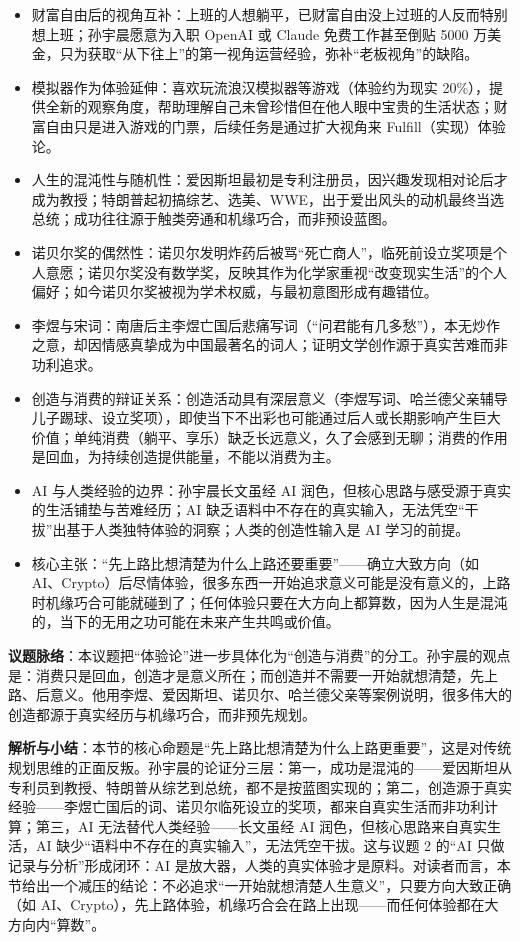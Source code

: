 \begin{itemize}
\tightlist
\item
  财富自由后的视角互补：上班的人想躺平，已财富自由没上过班的人反而特别想上班；孙宇晨愿意为入职
  OpenAI 或 Claude 免费工作甚至倒贴 5000
  万美金，只为获取``从下往上''的第一视角运营经验，弥补``老板视角''的缺陷。
\item
  模拟器作为体验延伸：喜欢玩流浪汉模拟器等游戏（体验约为现实
  20\%），提供全新的观察角度，帮助理解自己未曾珍惜但在他人眼中宝贵的生活状态；财富自由只是进入游戏的门票，后续任务是通过扩大视角来
  Fulfill（实现）体验论。
\item
  人生的混沌性与随机性：爱因斯坦最初是专利注册员，因兴趣发现相对论后才成为教授；特朗普起初搞综艺、选美、WWE，出于爱出风头的动机最终当选总统；成功往往源于触类旁通和机缘巧合，而非预设蓝图。
\item
  诺贝尔奖的偶然性：诺贝尔发明炸药后被骂``死亡商人''，临死前设立奖项是个人意愿；诺贝尔奖没有数学奖，反映其作为化学家重视``改变现实生活''的个人偏好；如今诺贝尔奖被视为学术权威，与最初意图形成有趣错位。
\item
  李煜与宋词：南唐后主李煜亡国后悲痛写词（``问君能有几多愁''），本无炒作之意，却因情感真挚成为中国最著名的词人；证明文学创作源于真实苦难而非功利追求。
\item
  创造与消费的辩证关系：创造活动具有深层意义（李煜写词、哈兰德父亲辅导儿子踢球、设立奖项），即使当下不出彩也可能通过后人或长期影响产生巨大价值；单纯消费（躺平、享乐）缺乏长远意义，久了会感到无聊；消费的作用是回血，为持续创造提供能量，不能以消费为主。
\item
  AI 与人类经验的边界：孙宇晨长文虽经 AI
  润色，但核心思路与感受源于真实的生活铺垫与苦难经历；AI
  缺乏语料中不存在的真实输入，无法凭空``干拔''出基于人类独特体验的洞察；人类的创造性输入是
  AI 学习的前提。
\item
  核心主张：``先上路比想清楚为什么上路还要重要''------确立大致方向（如
  AI、Crypto）后尽情体验，很多东西一开始追求意义可能是没有意义的，上路时机缘巧合可能就碰到了；任何体验只要在大方向上都算数，因为人生是混沌的，当下的无用之功可能在未来产生共鸣或价值。
\end{itemize}

\textbf{议题脉络}：本议题把``体验论''进一步具体化为``创造与消费''的分工。孙宇晨的观点是：消费只是回血，创造才是意义所在；而创造并不需要一开始就想清楚，先上路、后意义。他用李煜、爱因斯坦、诺贝尔、哈兰德父亲等案例说明，很多伟大的创造都源于真实经历与机缘巧合，而非预先规划。

\textbf{解析与小结}：本节的核心命题是``先上路比想清楚为什么上路更重要''，这是对传统规划思维的正面反叛。孙宇晨的论证分三层：第一，成功是混沌的------爱因斯坦从专利员到教授、特朗普从综艺到总统，都不是按蓝图实现的；第二，创造源于真实经验------李煜亡国后的词、诺贝尔临死设立的奖项，都来自真实生活而非功利计算；第三，AI
无法替代人类经验------长文虽经 AI 润色，但核心思路来自真实生活，AI
缺少``语料中不存在的真实输入''，无法凭空干拔。这与议题 2 的``AI
只做记录与分析''形成闭环：AI
是放大器，人类的真实体验才是原料。对读者而言，本节给出一个减压的结论：不必追求``一开始就想清楚人生意义''，只要方向大致正确（如
AI、Crypto），先上路体验，机缘巧合会在路上出现------而任何体验都在大方向内``算数''。

